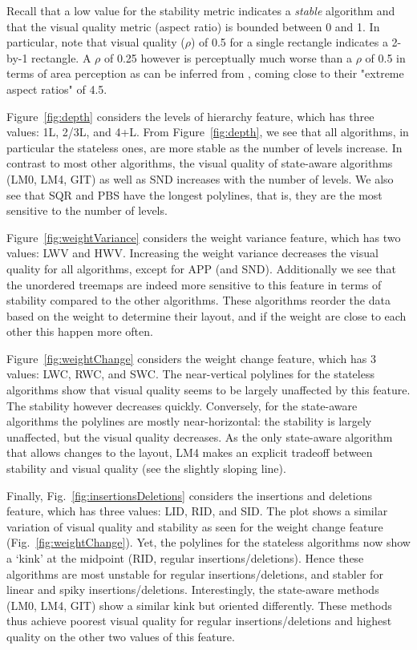 Recall that a low value for the stability metric indicates a \emph{stable} algorithm and that the visual quality metric (aspect ratio) is bounded between 0 and 1. In particular, note that visual quality ($\rho$) of 0.5 for a single rectangle indicates a 2-by-1 rectangle.  
A $\rho$ of 0.25 however is perceptually much worse than a $\rho$ of 0.5 in terms of area perception as can be inferred from \cite{Kong2010}, coming close to their "extreme aspect ratios" of 4.5.



 Figure~\ref{fig:depth} considers the levels of hierarchy feature, which has three values: 1L, 2/3L, and 4+L. 
From Figure~\ref{fig:depth}, we see that all algorithms, in particular the stateless ones, are more stable as the number of levels increase. In contrast to most other algorithms, the visual quality of state-aware algorithms (LM0, LM4, GIT) as well as SND increases with the number of levels. 
We also see that SQR and PBS have the longest polylines, that is, they are the most sensitive to the number of levels.  

 Figure~\ref{fig:weightVariance} considers the weight variance feature, which has two values: LWV and HWV. 
Increasing the weight variance decreases the visual quality for all algorithms, except for APP (and SND). Additionally we see that the unordered treemaps are indeed more sensitive to this feature in terms of stability compared to the other algorithms. These algorithms reorder the data based on the weight to determine their layout, and if the weight are close to each other this happen more often.

 Figure~\ref{fig:weightChange} considers the weight change feature, which has 3 values: LWC, RWC, and SWC. The near-vertical polylines for the stateless algorithms show that visual quality seems to be largely unaffected by this feature. The stability however decreases quickly. Conversely, for the state-aware algorithms the polylines are mostly near-horizontal: the stability is largely unaffected, but the visual quality decreases. As the only state-aware algorithm that allows changes to the layout, LM4 makes an explicit tradeoff between stability and visual quality (see the slightly sloping line).

 Finally, Fig.~\ref{fig:insertionsDeletions} considers the insertions and deletions feature, which has three values: LID, RID, and SID.
The plot shows a similar variation of visual quality and stability as seen for the weight change feature (Fig.~\ref{fig:weightChange}). 
Yet, the polylines for the stateless algorithms now show a `kink' at the midpoint (RID, regular insertions/deletions). Hence these algorithms are most unstable for regular insertions/deletions, and stabler for linear and spiky insertions/deletions. Interestingly, the state-aware methods (LM0, LM4, GIT) show a similar kink but oriented differently. These methods thus achieve poorest visual quality for regular insertions/deletions and highest quality on the other two values of this feature.

